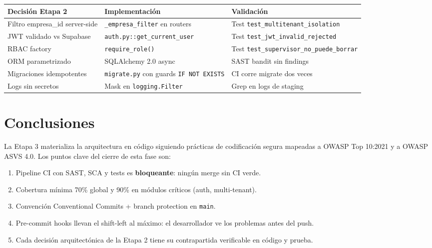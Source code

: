\documentclass[12pt,a4paper,oneside]{article}
\begin{document}
\begin{table}[h]
\centering
\small
\begin{tabularx}{\textwidth}{llX}
\toprule
\textbf{Decisión Etapa 2} & \textbf{Implementación} & \textbf{Validación} \\
\midrule
Filtro empresa\_id server-side & \texttt{\_empresa\_filter} en routers & Test \texttt{test\_multitenant\_isolation} \\
JWT validado vs Supabase & \texttt{auth.py::get\_current\_user} & Test \texttt{test\_jwt\_invalid\_rejected} \\
RBAC factory & \texttt{require\_role()} & Test \texttt{test\_supervisor\_no\_puede\_borrar} \\
ORM parametrizado & SQLAlchemy 2.0 async & SAST bandit sin findings \\
Migraciones idempotentes & \texttt{migrate.py} con guards \texttt{IF NOT EXISTS} & CI corre migrate dos veces \\
Logs sin secretos & Mask en \texttt{logging.Filter} & Grep en logs de staging \\
\bottomrule
\end{tabularx}
\end{table}

\section{Conclusiones}

La Etapa 3 materializa la arquitectura en código siguiendo prácticas de codificación segura mapeadas a OWASP Top 10:2021 y a OWASP ASVS 4.0. Los puntos clave del cierre de esta fase son:

\begin{enumerate}[leftmargin=*]
  \item Pipeline CI con SAST, SCA y tests es \textbf{bloqueante}: ningún merge sin CI verde.
  \item Cobertura mínima 70\% global y 90\% en módulos críticos (auth, multi-tenant).
  \item Convención Conventional Commits + branch protection en \texttt{main}.
  \item Pre-commit hooks llevan el shift-left al máximo: el desarrollador ve los problemas antes del push.
  \item Cada decisión arquitectónica de la Etapa 2 tiene su contrapartida verificable en código y prueba.
\end{enumerate}
\end{document}
